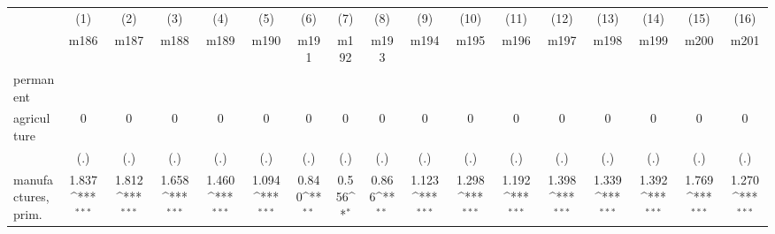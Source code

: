 {
\def\sym#1{\ifmmode^{#1}\else\(^{#1}\)\fi}
\begin{tabular}{l*{16}{c}}
\hline\hline
                    &\multicolumn{1}{c}{(1)}&\multicolumn{1}{c}{(2)}&\multicolumn{1}{c}{(3)}&\multicolumn{1}{c}{(4)}&\multicolumn{1}{c}{(5)}&\multicolumn{1}{c}{(6)}&\multicolumn{1}{c}{(7)}&\multicolumn{1}{c}{(8)}&\multicolumn{1}{c}{(9)}&\multicolumn{1}{c}{(10)}&\multicolumn{1}{c}{(11)}&\multicolumn{1}{c}{(12)}&\multicolumn{1}{c}{(13)}&\multicolumn{1}{c}{(14)}&\multicolumn{1}{c}{(15)}&\multicolumn{1}{c}{(16)}\\
                    &\multicolumn{1}{c}{m186}&\multicolumn{1}{c}{m187}&\multicolumn{1}{c}{m188}&\multicolumn{1}{c}{m189}&\multicolumn{1}{c}{m190}&\multicolumn{1}{c}{m191}&\multicolumn{1}{c}{m192}&\multicolumn{1}{c}{m193}&\multicolumn{1}{c}{m194}&\multicolumn{1}{c}{m195}&\multicolumn{1}{c}{m196}&\multicolumn{1}{c}{m197}&\multicolumn{1}{c}{m198}&\multicolumn{1}{c}{m199}&\multicolumn{1}{c}{m200}&\multicolumn{1}{c}{m201}\\
\hline
permanent           &                     &                     &                     &                     &                     &                     &                     &                     &                     &                     &                     &                     &                     &                     &                     &                     \\
agriculture         &           0         &           0         &           0         &           0         &           0         &           0         &           0         &           0         &           0         &           0         &           0         &           0         &           0         &           0         &           0         &           0         \\
                    &         (.)         &         (.)         &         (.)         &         (.)         &         (.)         &         (.)         &         (.)         &         (.)         &         (.)         &         (.)         &         (.)         &         (.)         &         (.)         &         (.)         &         (.)         &         (.)         \\
[1em]
manufactures, prim. &       1.837\sym{***}&       1.812\sym{***}&       1.658\sym{***}&       1.460\sym{***}&       1.094\sym{***}&       0.840\sym{**} &       0.556\sym{*}  &       0.866\sym{**} &       1.123\sym{***}&       1.298\sym{***}&       1.192\sym{***}&       1.398\sym{***}&       1.339\sym{***}&       1.392\sym{***}&       1.769\sym{***}&       1.270\sym{***}\\

\end{tabular}}
